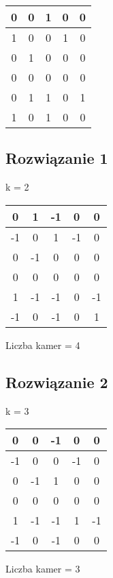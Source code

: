 \documentclass[12pt, letterpaper]{article}
\begin{document}
\begin{center}
  \begin{tabular}{|c|c|c|c|c|}
    \hline
    0 & 0 & 1 & 0 & 0 \\ \hline
    1 & 0 & 0 & 1 & 0 \\ \hline
    0 & 1 & 0 & 0 & 0 \\ \hline
    0 & 0 & 0 & 0 & 0 \\ \hline
    0 & 1 & 1 & 0 & 1 \\ \hline
    1 & 0 & 1 & 0 & 0 \\
    \hline
  \end{tabular}
\end{center}

\subsection{Rozwiązanie 1}

k = 2

\begin{center}
  \begin{tabular}{|c|c|c|c|c|}
    \hline
    0  & 1  & -1 & 0  & 0  \\ \hline
    -1 & 0  & 1  & -1 & 0  \\ \hline
    0  & -1 & 0  & 0  & 0  \\ \hline
    0  & 0  & 0  & 0  & 0  \\ \hline
    1  & -1 & -1 & 0  & -1 \\ \hline
    -1 & 0  & -1 & 0  & 1  \\
    \hline
  \end{tabular}
\end{center}

Liczba kamer = 4

\subsection{Rozwiązanie 2}

k = 3

\begin{center}
  \begin{tabular}{|c|c|c|c|c|}
    \hline
    0  & 0  & -1 & 0  & 0  \\ \hline
    -1 & 0  & 0  & -1 & 0  \\ \hline
    0  & -1 & 1  & 0  & 0  \\ \hline
    0  & 0  & 0  & 0  & 0  \\ \hline
    1  & -1 & -1 & 1  & -1 \\ \hline
    -1 & 0  & -1 & 0  & 0  \\
    \hline
  \end{tabular}
\end{center}

Liczba kamer = 3
\end{document}
